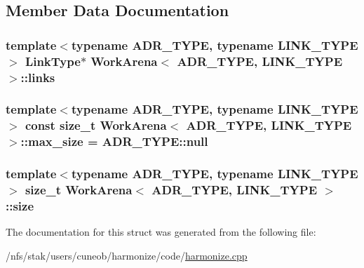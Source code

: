 \subsection{Member Data Documentation}
\hypertarget{structWorkArena_ab1707583be64a275e61cdb20a4806545}{
\subsubsection[{links}]{\setlength{\rightskip}{0pt plus 5cm}template$<$typename A\-D\-R\-\_\-\-T\-Y\-P\-E, typename L\-I\-N\-K\-\_\-\-T\-Y\-P\-E$>$ {\bf Link\-Type}$\ast$ {\bf Work\-Arena}$<$ A\-D\-R\-\_\-\-T\-Y\-P\-E, L\-I\-N\-K\-\_\-\-T\-Y\-P\-E $>$\-::links}}\label{structWorkArena_ab1707583be64a275e61cdb20a4806545}
\hypertarget{structWorkArena_ab715ef7888d28790b140f743aaafd460}{
\subsubsection[{max\-\_\-size}]{\setlength{\rightskip}{0pt plus 5cm}template$<$typename A\-D\-R\-\_\-\-T\-Y\-P\-E, typename L\-I\-N\-K\-\_\-\-T\-Y\-P\-E$>$ const size\-\_\-t {\bf Work\-Arena}$<$ A\-D\-R\-\_\-\-T\-Y\-P\-E, L\-I\-N\-K\-\_\-\-T\-Y\-P\-E $>$\-::max\-\_\-size = A\-D\-R\-\_\-\-T\-Y\-P\-E\-::null\hspace{0.3cm}{\ttfamily [static]}}}\label{structWorkArena_ab715ef7888d28790b140f743aaafd460}
\hypertarget{structWorkArena_a81695ccf6b50e8b81091fea89855a92a}{
\subsubsection[{size}]{\setlength{\rightskip}{0pt plus 5cm}template$<$typename A\-D\-R\-\_\-\-T\-Y\-P\-E, typename L\-I\-N\-K\-\_\-\-T\-Y\-P\-E$>$ size\-\_\-t {\bf Work\-Arena}$<$ A\-D\-R\-\_\-\-T\-Y\-P\-E, L\-I\-N\-K\-\_\-\-T\-Y\-P\-E $>$\-::size}}\label{structWorkArena_a81695ccf6b50e8b81091fea89855a92a}


The documentation for this struct was generated from the following file\-:\begin{DoxyCompactItemize}
\item 
/nfs/stak/users/cuneob/harmonize/code/\hyperlink{harmonize_8cpp}{harmonize.\-cpp}\end{DoxyCompactItemize}
